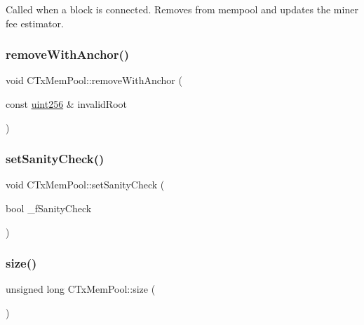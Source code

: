 Called when a block is connected. Removes from mempool and updates the miner fee estimator. \mbox{\label{class_c_tx_mem_pool_a16a2a45643106e2612c0f300af7459f7}} 
\subsubsection{\texorpdfstring{remove\+With\+Anchor()}{removeWithAnchor()}}
{\footnotesize\ttfamily void C\+Tx\+Mem\+Pool\+::remove\+With\+Anchor (\begin{DoxyParamCaption}\item[{const \mbox{\hyperlink{classuint256}{uint256}} \&}]{invalid\+Root }\end{DoxyParamCaption})}

\mbox{\label{class_c_tx_mem_pool_a1c0edb1fd5f0b02ddac46a6a97dcfd53}} 
\subsubsection{\texorpdfstring{set\+Sanity\+Check()}{setSanityCheck()}}
{\footnotesize\ttfamily void C\+Tx\+Mem\+Pool\+::set\+Sanity\+Check (\begin{DoxyParamCaption}\item[{bool}]{\+\_\+f\+Sanity\+Check }\end{DoxyParamCaption})\hspace{0.3cm}{\ttfamily [inline]}}

\mbox{\label{class_c_tx_mem_pool_a867f7b452141770f3b2e8697fb3513d8}} 
\subsubsection{\texorpdfstring{size()}{size()}}
{\footnotesize\ttfamily unsigned long C\+Tx\+Mem\+Pool\+::size (\begin{DoxyParamCaption}{ }\end{DoxyParamCaption})\hspace{0.3cm}{\ttfamily [inline]}}

